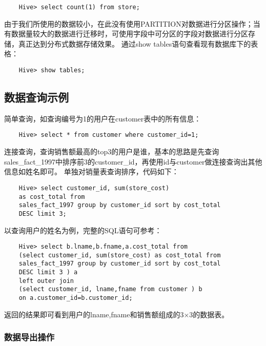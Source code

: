 \begin{lstlisting}
	Hive> select count(1) from store;
\end{lstlisting}

由于我们所使用的数据较小，在此没有使用PARTITION对数据进行分区操作；当有数据量较大的数据进行迁移时，可使用字段中可分区的字段对数据进行分区存储，真正达到分布式数据存储效果。
通过show tables语句查看现有数据库下的表格：

\begin{lstlisting}
	Hive> show tables;
\end{lstlisting}

\subsection{数据查询示例}\label{ux6570ux636eux67e5ux8be2ux793aux4f8b}

简单查询，如查询编号为1的用户在customer表中的所有信息：

\begin{lstlisting}
	Hive> select * from customer where customer_id=1;
\end{lstlisting}

连接查询，查询销售额最高的top3的用户是谁，基本的思路是先查询sales\_fact\_1997中排序前3的customer\_id，再使用id与customer做连接查询出其他信息如姓名即可。
单独对销量表查询排序，代码如下：

\begin{lstlisting}
	Hive> select customer_id, sum(store_cost) 
	as cost_total from 
	sales_fact_1997 group by customer_id sort by cost_total 
	DESC limit 3;
\end{lstlisting}

以查询用户的姓名为例，完整的SQL语句可参考：

\begin{lstlisting}
	Hive> select b.lname,b.fname,a.cost_total from 
	(select customer_id, sum(store_cost) as cost_total from
	sales_fact_1997 group by customer_id sort by cost_total
	DESC limit 3 ) a 
	left outer join 
	(select customer_id, lname,fname from customer ) b 
	on a.customer_id=b.customer_id;
\end{lstlisting}

返回的结果即可看到用户的lname,fname和销售额组成的3×3的数据表。

\subsubsection{数据导出操作}\label{ux6570ux636eux5bfcux51faux64cdux4f5c}

